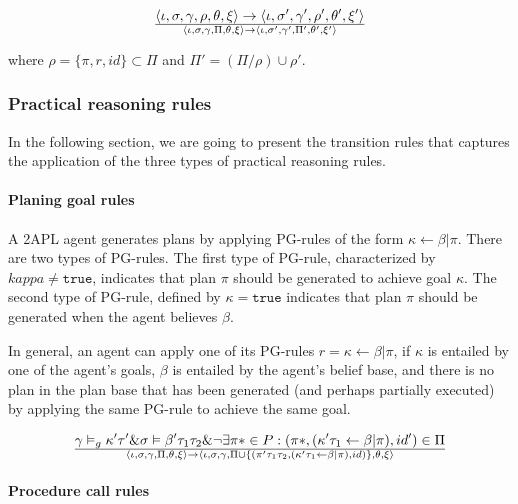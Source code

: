 \documentclass[a4paper]{article}
\begin{document}
$$ {\langle \iota, \sigma, \gamma, \rho, \theta, \xi \rangle \rightarrow \langle \iota, \sigma', \gamma', \rho', \theta', \xi' \rangle } \over {\langle \iota, \sigma, \gamma, \Pi, \theta, \xi \rangle \rightarrow \langle \iota, \sigma', \gamma', \Pi', \theta', \xi' \rangle}$$

where $\rho = \{\pi, r, id\} \subset \Pi $ and $\Pi' = (\Pi/\rho) \cup \rho'$.

\subsubsection{Practical reasoning rules}

In the following section, we are going to present the transition rules that captures the application of the three types of practical reasoning rules.

\paragraph{Planing goal rules}

A 2APL agent generates plans by applying PG-rules of the form $\kappa \leftarrow \beta \vert \pi$. There are two types of PG-rules. The first type of PG-rule, characterized by $kappa \neq \texttt{true}$, indicates that plan $\pi$ should be generated to achieve goal $\kappa$. The second type of PG-rule, defined by $\kappa = \texttt{true}$ indicates that plan $\pi$ should be generated when the agent believes $\beta$.

In general, an agent can apply one of its PG-rules $ r = \kappa \leftarrow \beta \vert \pi $, if $\kappa$ is entailed by one of the agent's goals, $\beta$ is entailed by the agent's belief base, and there is no plan in the plan base that has been generated (and perhaps partially executed) by applying the same PG-rule to achieve the same goal.

$$ {\gamma \vDash_{g} \kappa'\tau' \& \sigma \vDash \beta'\tau_{1}\tau_{2} \& \neg\exists\pi * \in P : (\pi *, (\kappa'\tau_{1} \leftarrow \beta \vert \pi), id') \in \Pi} \over {\langle \iota, \sigma, \gamma, \Pi, \theta, \xi \rangle \rightarrow \langle \iota, \sigma, \gamma, \Pi \cup \{(\pi'\tau_{1}\tau_{2}, (\kappa'\tau_{1} \leftarrow \beta \vert \pi), id) \}, \theta, \xi \rangle} $$

\paragraph{Procedure call rules}
\end{document}
